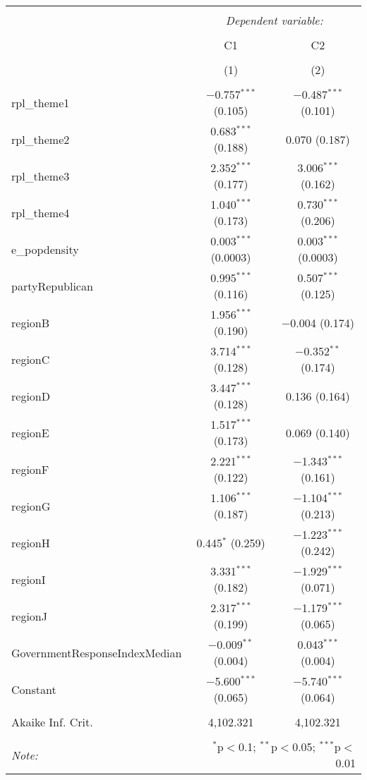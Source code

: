 
\begin{table}[!htbp] \centering 
  \caption{} 
  \label{} 
\begin{tabular}{@{\extracolsep{5pt}}lcc} 
\\[-1.8ex]\hline 
\hline \\[-1.8ex] 
 & \multicolumn{2}{c}{\textit{Dependent variable:}} \\ 
\cline{2-3} 
\\[-1.8ex] & C1 & C2 \\ 
\\[-1.8ex] & (1) & (2)\\ 
\hline \\[-1.8ex] 
 rpl\_theme1 & $-$0.757$^{***}$ (0.105) & $-$0.487$^{***}$ (0.101) \\ 
  rpl\_theme2 & 0.683$^{***}$ (0.188) & 0.070 (0.187) \\ 
  rpl\_theme3 & 2.352$^{***}$ (0.177) & 3.006$^{***}$ (0.162) \\ 
  rpl\_theme4 & 1.040$^{***}$ (0.173) & 0.730$^{***}$ (0.206) \\ 
  e\_popdensity & 0.003$^{***}$ (0.0003) & 0.003$^{***}$ (0.0003) \\ 
  partyRepublican & 0.995$^{***}$ (0.116) & 0.507$^{***}$ (0.125) \\ 
  regionB & 1.956$^{***}$ (0.190) & $-$0.004 (0.174) \\ 
  regionC & 3.714$^{***}$ (0.128) & $-$0.352$^{**}$ (0.174) \\ 
  regionD & 3.447$^{***}$ (0.128) & 0.136 (0.164) \\ 
  regionE & 1.517$^{***}$ (0.173) & 0.069 (0.140) \\ 
  regionF & 2.221$^{***}$ (0.122) & $-$1.343$^{***}$ (0.161) \\ 
  regionG & 1.106$^{***}$ (0.187) & $-$1.104$^{***}$ (0.213) \\ 
  regionH & 0.445$^{*}$ (0.259) & $-$1.223$^{***}$ (0.242) \\ 
  regionI & 3.331$^{***}$ (0.182) & $-$1.929$^{***}$ (0.071) \\ 
  regionJ & 2.317$^{***}$ (0.199) & $-$1.179$^{***}$ (0.065) \\ 
  GovernmentResponseIndexMedian & $-$0.009$^{**}$ (0.004) & 0.043$^{***}$ (0.004) \\ 
  Constant & $-$5.600$^{***}$ (0.065) & $-$5.740$^{***}$ (0.064) \\ 
 \hline \\[-1.8ex] 
Akaike Inf. Crit. & 4,102.321 & 4,102.321 \\ 
\hline 
\hline \\[-1.8ex] 
\textit{Note:}  & \multicolumn{2}{r}{$^{*}$p$<$0.1; $^{**}$p$<$0.05; $^{***}$p$<$0.01} \\ 
\end{tabular} 
\end{table} 

